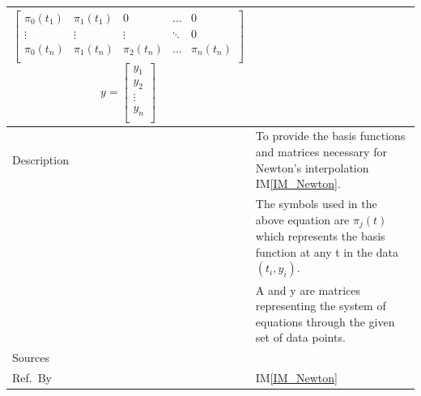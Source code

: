 \documentclass[12pt]{article}
\newcommand{\colAwidth}{0.13\textwidth}
\newcommand{\colBwidth}{0.82\textwidth}
\newcommand{\iref}[1]{IM\ref{#1}}
\begin{document}
\begin{minipage}{\textwidth}
\begin{tabular}{| p{\colAwidth} | p{\colBwidth}|}
\begin{equation*}
\begin{bmatrix}
		\pi_0 (t_1) & \pi_1 (t_1) & 0            & \dots         & 0 \\
		\vdots      & \vdots      & \vdots       &\ddots         & 0 \\
		\pi_0 (t_n) & \pi_1 (t_n) & \pi_2 (t_n)  & \dots         & \pi_n (t_n) \\
		\end{bmatrix}
		\end{equation*}
		\begin{equation*}
		y = \begin{bmatrix}
		y_1  \\
		y_2 \\
		\vdots \\
		y_n \\
		\end{bmatrix} 
		\end{equation*} \\
		\hline
		
		Description 
		&To provide the basis functions and matrices necessary for Newton's interpolation \iref{IM_Newton}.\\
		& The symbols used in the above equation are $\pi_j(t)$ which represents the basis function at any t in the data $(t_i, y_i)$.\\
		&A and y are matrices representing the system of equations through the given set of data points.\\
		\hline
		
		
		Sources
		& ~\cite{Health1997}\\
		\hline
		
		Ref.\ By 
		& \iref{IM_Newton}\\
		\hline
		
	\end{tabular}
\end{minipage}\\
\end{document}
